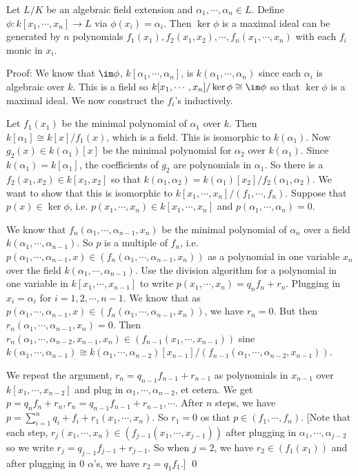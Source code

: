 \begin{lem}[Lemma A]
Let $L/K$ be an algebraic field extension and $\alpha_1,\cdots,\alpha_n \in L$. Define $\phi: k[x_1,\cdots,x_n] \to L$ via $\phi(x_i)=\alpha_i$. Then $\ker \phi$ is a maximal ideal can be generated by $n$ polynomials $f_1(x_1),f_2(x_1,x_2),\cdots,f_n(x_1,\cdots,x_n)$ with each $f_i$ monic in $x_i$. 
\end{lem}

\noindent Proof: We know that $\im \phi$, $k[\alpha_1,\cdots,\alpha_n]$, is $k(\alpha_1,\cdots,\alpha_n)$ since each $\alpha_i$ is algebraic over $k$. This is a field so $k[x_1,\cdots,x_n]/\ker \phi \cong \im \phi$ so that $\ker \phi$ is a maximal ideal. We now construct the $f_i$'s inductively. 

Let $f_1(x_1)$ be the minimal polynomial of $\alpha_1$ over $k$. Then $k[\alpha_1] \cong k[x]/f_1(x)$, which is a field. This is isomorphic to $k(\alpha_1)$. Now $g_2(x) \in k(\alpha_1)[x]$ be the minimal polynomial for $\alpha_2$ over $k(\alpha_1)$. Since $k(\alpha_1)=k[\alpha_1]$, the coefficients of $g_2$ are polynomials in $\alpha_1$. So there is a $f_2(x_1,x_2) \in k[x_1,x_2]$ so that $k(\alpha_1,\alpha_2)=k(\alpha_1)[x_2]/f_2(\alpha_1,\alpha_2)$. We want to show that this is isomorphic to $k[x_1,\cdots,x_n]/(f_1,\cdots,f_n)$. Suppose that $p(x) \in \ker \phi$, i.e. $p(x_1,\cdots,x_n) \in k[x_1,\cdots,x_n]$ and $p(\alpha_1,\cdots,\alpha_n)=0$. 

We know that $f_n(\alpha_1,\cdots,\alpha_{n-1},x_n)$ be the minimal polynomial of $\alpha_n$ over a field $k(\alpha_1,\cdots,\alpha_{n-1})$. So $p$ is a multiple of $f_n$, i.e. $p(\alpha_1,\cdots,\alpha_{n-1},x) \in (f_n(\alpha_1,\cdots,\alpha_{n-1},x_n))$ as a polynomial in one variable $x_n$ over the field $k(\alpha_1,\cdots,\alpha_{n-1})$. Use the division algorithm for a polynomial in one variable in $k[x_1,\cdots,x_{n-1}]$ to write $p(x_1,\cdots,x_n)=q_nf_n+r_n$. Plugging in $x_i=\alpha_i$ for $i=1,2,\cdots,n-1$. We know that as $p(\alpha_1,\cdots,\alpha_{n-1},x) \in (f_n(\alpha_1,\cdots,\alpha_{n-1},x_n))$, we have $r_n=0$. But then $r_n(\alpha_1,\cdots,\alpha_{n-1},x_n)=0$. Then $r_n(\alpha_1,\cdots,\alpha_{n-2},x_{n-1},x_n) \in (f_{n-1}(x_1,\cdots,x_{n-1}))$ sine $k(\alpha_1,\cdots,\alpha_{n-1}) \cong k(\alpha_1,\cdots,\alpha_{n-2})[x_{n-1}]/(f_{n-1}(\alpha_1,\cdots,\alpha_{n-2},x_{n-1}))$. 

We repeat the argument, $r_n=q_{n-1}f_{n-1}+r_{n-1}$ as polynomials in $x_{n-1}$ over $k[x_1,\cdots,x_{n-2}]$ and plug in $\alpha_1,\cdots,\alpha_{n-2}$, et cetera. We get $p=q_nf_n+r_n,r_n=q_{n-1}f_{n-1}+r_{n-1},\cdots$. After $n$ steps, we have $p=\sum_{i=1}^n q_i+f_i+r_1(x_1,\cdots,x_n)$. So $r_1=0$ os that $p \in (f_1,\cdots,f_n)$. [Note that each step, $r_j(x_1,\cdots,x_n) \in (f_{j-1}(x_1,\cdots,x_{j-1}))$ after plugging in $\alpha_1,\cdots,\alpha_{j-2}$ so we write $r_j=q_{j-1}f_{j-1}+r_{j-1}$. So when $j=2$, we have $r_2 \in (f_1(x_1))$ and after plugging in 0 $\alpha$'s, we have $r_2=q_1f_1$.] \qed \\

